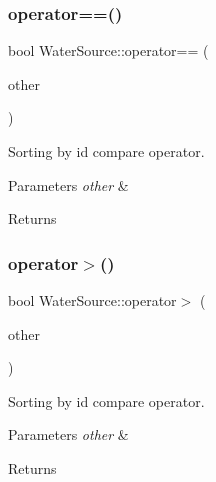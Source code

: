 \subsubsection{\texorpdfstring{operator==()}{operator==()}}
{\footnotesize\ttfamily bool Water\+Source\+::operator== (\begin{DoxyParamCaption}\item[{const \mbox{\hyperlink{classWaterSource}{Water\+Source}} $\ast$}]{other }\end{DoxyParamCaption})}

Sorting by id compare operator. 
\begin{DoxyParams}{Parameters}
{\em other} & \\
\hline
\end{DoxyParams}
\begin{DoxyReturn}{Returns}

\end{DoxyReturn}
\mbox{\label{classWaterSource_a9db800769891e1f49d74a78298f4dac1_a9db800769891e1f49d74a78298f4dac1}} 
\subsubsection{\texorpdfstring{operator$>$()}{operator>()}}
{\footnotesize\ttfamily bool Water\+Source\+::operator$>$ (\begin{DoxyParamCaption}\item[{const \mbox{\hyperlink{classWaterSource}{Water\+Source}} $\ast$}]{other }\end{DoxyParamCaption})}

Sorting by id compare operator. 
\begin{DoxyParams}{Parameters}
{\em other} & \\
\hline
\end{DoxyParams}
\begin{DoxyReturn}{Returns}

\end{DoxyReturn}
\mbox{\label{classWaterSource_aebc6985952d3e69f0d8ae1d0498a1ffe_aebc6985952d3e69f0d8ae1d0498a1ffe}} 
